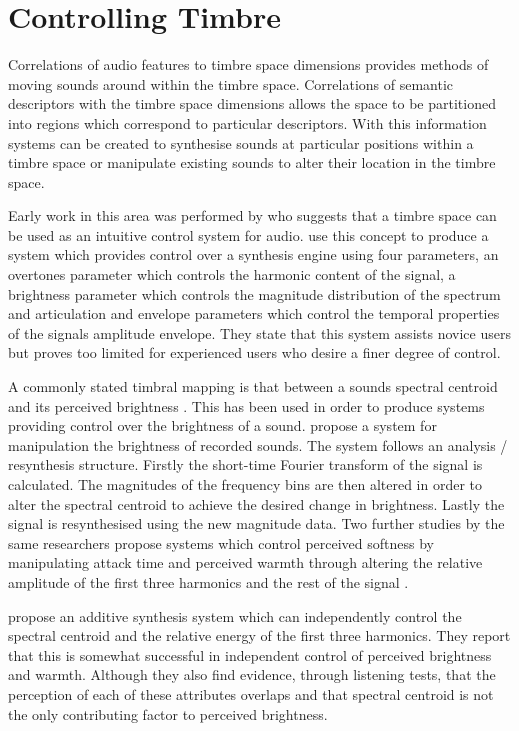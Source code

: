 \section{Controlling Timbre}
\label{sec:Timbre-Control}
	Correlations of audio features to timbre space dimensions provides methods of moving sounds around within the
	timbre space. Correlations of semantic descriptors with the timbre space dimensions allows the space to be
	partitioned into regions which correspond to particular descriptors. With this information systems can be created
	to synthesise sounds at particular positions within a timbre space or manipulate existing sounds to alter their
	location in the timbre space.

	Early work in this area was performed by \citet{wessel1979timbre} who suggests that a timbre space can be used as
	an intuitive control system for audio. \citet{vertegaal1994isee} use this concept to produce a system which
	provides control over a synthesis engine using four parameters, an overtones parameter which controls the harmonic
	content of the signal, a brightness parameter which controls the magnitude distribution of the spectrum and
	articulation and envelope parameters which control the temporal properties of the signals amplitude envelope. They
	state that this system assists novice users but proves too limited for experienced users who desire a finer degree
	of control.

	A commonly stated timbral mapping is that between a sounds spectral centroid and its perceived brightness
	\citep{schubert2006does}. This has been used in order to produce systems providing control over the brightness of a
	sound. \citet{williams2007perceptually} propose a system for manipulation the brightness of recorded sounds. The
	system follows an analysis / resynthesis structure. Firstly the short-time Fourier transform of the signal is
	calculated. The magnitudes of the frequency bins are then altered in order to alter the spectral centroid to
	achieve the desired change in brightness. Lastly the signal is resynthesised using the new magnitude data.  Two
	further studies by the same researchers propose systems which control perceived softness by manipulating attack
	time \citep{williams2009perceptually} and perceived warmth through altering the relative amplitude of the first
	three harmonics and the rest of the signal \citep{williams2010perceptually}.

	\citet{zacharakis2011an} propose an additive synthesis system which can independently control the spectral centroid
	and the relative energy of the first three harmonics. They report that this is somewhat successful in independent
	control of perceived brightness and warmth. Although they also find evidence, through listening tests, that the
	perception of each of these attributes overlaps and that spectral centroid is not the only contributing factor to
	perceived brightness.

